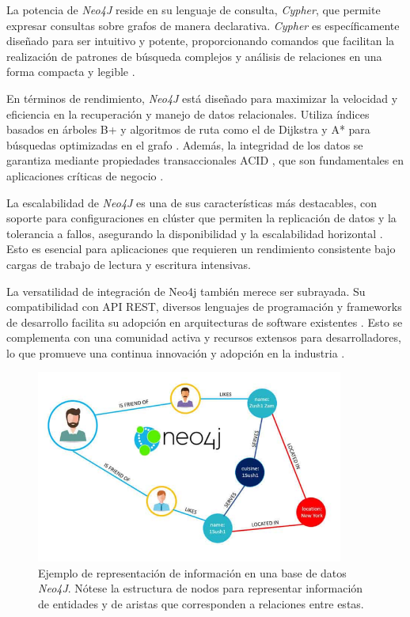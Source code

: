 La potencia de \textit{Neo4J} reside en su lenguaje de consulta, \textit{Cypher}, que permite expresar consultas sobre grafos de manera declarativa. \textit{Cypher} es específicamente diseñado para ser intuitivo y potente, proporcionando comandos que facilitan la realización de patrones de búsqueda complejos y análisis de relaciones en una forma compacta y legible \cite{neo4j}.

En términos de rendimiento,  \textit{Neo4J} está diseñado para maximizar la velocidad y eficiencia en la recuperación y manejo de datos relacionales. Utiliza índices basados en árboles B+ y algoritmos de ruta como el de Dijkstra y A* para búsquedas optimizadas en el grafo \cite{neo4j2021dijkstra} \cite{neo4j2021astar}. Además, la integridad de los datos se garantiza mediante propiedades transaccionales ACID \cite{acidtransaction}, que son fundamentales en aplicaciones críticas de negocio \cite{vukoticabedrabboandpartner2014}.

La escalabilidad de  \textit{Neo4J} es una de sus características más destacables, con soporte para configuraciones en clúster que permiten la replicación de datos y la tolerancia a fallos, asegurando la disponibilidad y la escalabilidad horizontal \cite{neo4j}. Esto es esencial para aplicaciones que requieren un rendimiento consistente bajo cargas de trabajo de lectura y escritura intensivas.

La versatilidad de integración de Neo4j también merece ser subrayada. Su compatibilidad con API REST, diversos lenguajes de programación y frameworks de desarrollo facilita su adopción en arquitecturas de software existentes \cite{neo4j}. Esto se complementa con una comunidad activa y recursos extensos para desarrolladores, lo que promueve una continua innovación y adopción en la industria \cite{neo4jusecases}.

\begin{figure}[H]\label{neo4jdb}
	\centering
	\includegraphics[width = 0.9\textwidth]{./Graphics/neo4j}
	\caption{Ejemplo de representación de información en una base de datos \textit{Neo4J}. Nótese la estructura de nodos para representar información de entidades y de aristas que corresponden a relaciones entre estas.}
\end{figure} 

